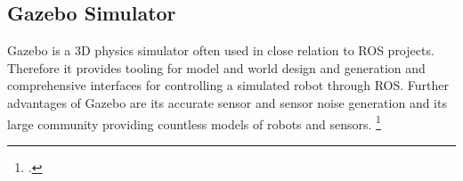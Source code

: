 \subsection{Gazebo Simulator}\label{section:gazebo}
Gazebo is a 3D physics simulator often used in close relation to ROS projects. Therefore it provides tooling for model and world design and generation and comprehensive interfaces for controlling a simulated robot through ROS. Further advantages of Gazebo are its accurate sensor and sensor noise generation and its large community providing countless models of robots and sensors. \footcite{openSourceRoboticsFoundationGazeboNodate}

\filbreak